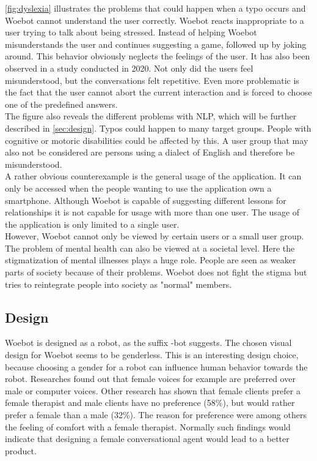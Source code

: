 \autoref{fig:dyslexia} illustrates the problems that could happen when a typo occurs and Woebot cannot understand the user correctly.
Woebot reacts inappropriate to a user trying to talk about being stressed.
Instead of helping Woebot misunderstands the user and continues suggesting a game, followed up by joking around.
This behavior obviously neglects the feelings of the user.
It has also been observed in a study conducted in 2020\cite{investigating-students}.
Not only did the users feel misunderstood, but the conversations felt repetitive.
Even more problematic is the fact that the user cannot abort the current interaction and is forced to choose one of the predefined answers.\\

The figure also reveals the different problems with NLP, which will be further described in \autoref{sec:design}.
Typos could happen to many target groups.
People with cognitive or motoric disabilities could be affected by this.
A user group that may also not be considered are persons using a dialect of English and therefore be misunderstood.\\

A rather obvious counterexample is the general usage of the application.
It can only be accessed when the people wanting to use the application own a smartphone.
Although Woebot is capable of suggesting different lessons for relationships it is not capable for usage with more than one user.
The usage of the application is only limited to a single user.\\

However, Woebot cannot only be viewed by certain users or a small user group.
The problem of mental health can also be viewed at a societal level.
Here the stigmatization of mental illnesses plays a huge role\cite{stigmatization}.
People are seen as weaker parts of society because of their problems.
Woebot does not fight the stigma but tries to reintegrate people into society as "normal" members.


\subsection{Design}\label{sec:design}
Woebot is designed as a robot, as the suffix -bot suggests.
The chosen visual design for Woebot seems to be genderless.
This is an interesting design choice, because choosing a gender for a robot can influence human behavior towards the robot.
Researches found out that female voices for example are preferred over male or computer voices\cite{bias-robot}.
Other research has shown that female clients prefer a female therapist and male clients have no preference (58\%), but would rather prefer a female than a male (32\%)\cite{client-gender-preference}.
The reason for preference were among others the feeling of comfort with a female therapist.
Normally such findings would indicate that designing a female conversational agent would lead to a better product.\\

